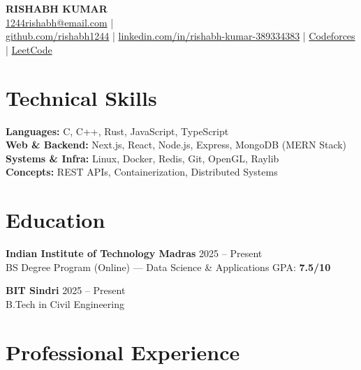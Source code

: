 \documentclass[a4paper,10pt]{article}
\begin{document}
\begin{center}
    {\Huge \textbf{RISHABH KUMAR}} \\[6pt]
    \small
    \href{mailto:1244rishabh@email.com}{1244rishabh@email.com}
    \quad| \\[3pt]

    \href{https://github.com/rishabh1244}{github.com/rishabh1244}
    \quad|\quad
    \href{https://linkedin.com/in/rishabh-kumar-389334383}{linkedin.com/in/rishabh-kumar-389334383}
    \quad|\quad
    \href{https://codeforces.com/profile/rizzabh1244}{Codeforces}
    \quad|\quad
    \href{https://leetcode.com/u/rishabh1244}{LeetCode}
\end{center}

\vspace{-5pt}

\section*{Technical Skills}

\textbf{Languages:} C, C++, Rust, JavaScript, TypeScript \\
\textbf{Web \& Backend:} Next.js, React, Node.js, Express, MongoDB (MERN Stack) \\
\textbf{Systems \& Infra:} Linux, Docker, Redis, Git, OpenGL, Raylib \\
\textbf{Concepts:} REST APIs, Containerization, Distributed Systems

\section*{Education}

\textbf{Indian Institute of Technology Madras} \hfill 2025 -- Present \\
BS Degree Program (Online) --- Data Science \& Applications \quad GPA: \textbf{7.5/10}
\vspace{2pt}

\textbf{BIT Sindri} \hfill 2025 -- Present \\
B.Tech in Civil Engineering

\section*{Professional Experience}
\end{document}
